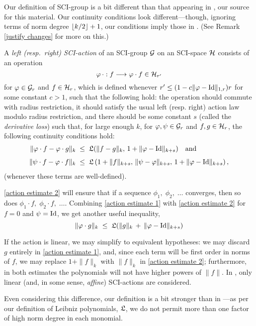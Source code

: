 \documentclass{article}
\begin{document}
\begin{rem}
Our definition of SCI-group is a bit different than that appearing in \cite{MirandaMonnierZung}, our source for this material.  Our continuity conditions look different---though, ignoring terms of norm degree $\left\lfloor k/2 \right\rfloor+1$, our conditions imply those in \cite{MirandaMonnierZung}.  (See Remark \ref{justify changes} for more on this.)
\end{rem}


\begin{defn}\label{SCI action}
A \emph{left (resp.\ right) SCI-action} of an SCI-group $\mathcal G$ on an SCI-space $\mathcal H$ consists of an operation
$$\varphi\,\cdot : f \longrightarrow \varphi\cdot f \in \mathcal H_{r'}$$
for $\varphi \in \mathcal G_r$ and $f \in \mathcal H_r$, which is defined whenever $r' \leq (1-c\|\varphi-\textrm{Id}\|_{1,r})r$ for some constant $c>1$, such that the following hold: the operation should commute with radius restriction, it should satisfy the usual left (resp. right) action law modulo radius restriction, and there should be some constant $s$ (called the \emph{derivative loss}) such that, for large enough $k$, for $\varphi,\psi \in \mathcal{G}_r$ and $f,g \in \mathcal{H}_r$, the following continuity conditions hold:
\begin{align}
\|\phi\cdot f - \phi\cdot g\|_k & \;\leq\; 
 \LP(\|f-g\|_k,\, 1+\|\phi-\Id\|_{k+s}) \quad\textnormal{and} \label{action estimate 1} \\[4pt]
\|\psi\cdot f - \phi\cdot f\|_k & \;\leq\; 
 \LP\left(1+\|f\|_{k+s},\, \|\psi-\phi\|_{k+s},\, 1+\|\phi-\Id\|_{k+s}\right), \label{action estimate 2} 
\end{align}
(whenever these terms are well-defined).
\end{defn}

\begin{rem}
\eqref{action estimate 2} will ensure that if a sequence $\phi_1,\;\phi_2,\;\ldots$ converges, then so does $\phi_1\cdot f,\; \phi_2\cdot f,\; \ldots$.  Combining \eqref{action estimate 1} with \eqref{action estimate 2} for $f=0$ and $\psi=\textrm{Id}$, we get another useful inequality,
\begin{equation}\label{nonlinear action estimate}
\|\phi\cdot g\|_k \;\leq\; \LP(\|g\|_k \,+\, \|\phi-\Id\|_{k+s})
\end{equation}
\end{rem}

\begin{rem}\label{action nonlinearity}
If the action is linear, we may simplify to equivalent hypotheses: we may discard $g$ entirely in \eqref{action estimate 1}, and, since each term will be first order in norms of $f$, we may replace $1+\|f\|_k$ with $\|f\|_k$ in \eqref{action estimate 2}; furthermore, in both estimates the polynomials will not have higher powers of $\|f\|$.  In \cite{MirandaMonnierZung}, only linear (and, in some sense, \emph{affine}) SCI-actions are considered.

Even considering this difference, our definition is a bit stronger than in \cite{MirandaMonnierZung}---as per our definition of Leibniz polynomials, $\mathfrak{L}$, we do not permit more than one factor of high norm degree in each monomial.
\end{rem}
\end{document}
